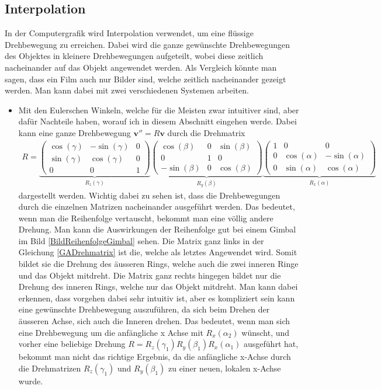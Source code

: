 \subsection{Interpolation}
In der Computergrafik wird Interpolation verwendet, um eine flüssige Drehbewegung zu erreichen. Dabei wird die ganze gewünschte Drehbewegungen des Objektes in kleinere Drehbewegungen aufgeteilt, wobei diese zeitlich nacheinander auf das Objekt angewendet werden. Als Vergleich könnte man sagen, dass ein Film auch nur Bilder sind, welche zeitlich nacheinander gezeigt werden. Man kann dabei mit zwei verschiedenen Systemen arbeiten. 
\begin{itemize}
	\item Mit den Eulerschen Winkeln, welche für die Meisten zwar intuitiver sind, aber dafür Nachteile haben, worauf ich in diesem Abschnitt eingehen werde. Dabei kann eine ganze Drehbewegung $\mathbf{v}'' = R\mathbf{v}$ durch die Drehmatrix
	\begin{align} \label{GADrehmatrix}
	R = 
	\underbrace{
		\begin{pmatrix} 
		\cos(\gamma) & -\sin(\gamma) & 0\\ \sin(\gamma) & \cos(\gamma) & 0 \\ 0 & 0 & 1 
		\end{pmatrix}
	}_{\displaystyle{R_z(\gamma)}}
	\underbrace{
		\begin{pmatrix}
		\cos(\beta) &  0 & \sin(\beta)\\ 0 & 1 & 0 \\ -\sin(\beta) & 0 & \cos(\beta)
		\end{pmatrix}
	}_{\displaystyle{R_y(\beta)}}
	\underbrace{
		\begin{pmatrix} 
		1 & 0 & 0 \\ 0 & \cos(\alpha) & -\sin(\alpha)\\ 0 & \sin(\alpha) & \cos(\alpha)
		\end{pmatrix}
	}_{\displaystyle{R_x(\alpha)}}
	\end{align}
	dargestellt werden. Wichtig dabei zu sehen ist, dass die Drehbewegungen durch die einzelnen Matrizen nacheinander ausgeführt werden. Das bedeutet, wenn man die Reihenfolge vertauscht, bekommt man eine völlig andere Drehung. Man kann die Auswirkungen der Reihenfolge gut bei einem Gimbal im Bild \ref{BildReihenfolgeGimbal} sehen. Die Matrix ganz links in der Gleichung \eqref{GADrehmatrix} ist die, welche als letztes Angewendet wird. Somit bildet sie die Drehung des äusseren Rings, welche auch die zwei inneren Ringe und das Objekt mitdreht. Die Matrix ganz rechts hingegen bildet nur die Drehung des inneren Rings, welche nur das Objekt mitdreht. Man kann dabei erkennen, dass vorgehen dabei sehr intuitiv ist, aber es kompliziert sein kann eine gewünschte Drehbewegung auszuführen, da sich beim Drehen der äusseren Achse, sich auch die Inneren drehen. Das bedeutet, wenn man sich eine Drehbewegung um die anfängliche x Achse mit $R_x(\alpha_2)$ wünscht, und vorher eine beliebige Drehung $R = R_z(\gamma_1) R_y(\beta_1) R_x(\alpha_1)$ ausgeführt hat, bekommt man nicht das richtige Ergebnis, da die anfängliche x-Achse durch die Drehmatrizen $R_z(\gamma_1)$ und $R_y(\beta_1)$ zu einer neuen, lokalen x-Achse wurde. 

\end{itemize}
